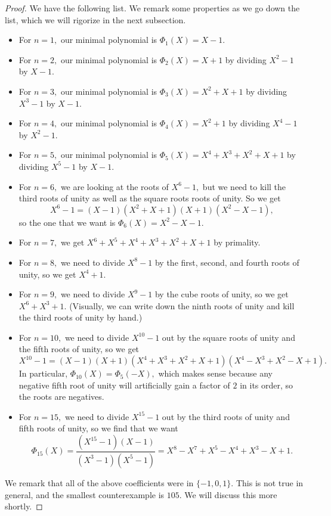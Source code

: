 \documentclass[../notes.tex]{subfiles}
\begin{document}
\begin{proof}
	We have the following list. We remark some properties as we go down the list, which we will rigorize in the next subsection.
	\begin{itemize}
		\item For $n=1,$ our minimal polynomial is $\Phi_1(X)=X-1.$
		\item For $n=2,$ our minimal polynomial is $\Phi_2(X)=X+1$ by dividing $X^2-1$ by $X-1.$
		\item For $n=3,$ our minimal polynomial is $\Phi_3(X)=X^2+X+1$ by dividing $X^3-1$ by $X-1.$
		\item For $n=4,$ our minimal polynomial is $\Phi_4(X)=X^2+1$ by dividing $X^4-1$ by $X^2-1.$
		\item For $n=5,$ our minimal polynomial is $\Phi_5(X)=X^4+X^3+X^2+X+1$ by dividing $X^5-1$ by $X-1.$ 
		\item For $n=6,$ we are looking at the roots of $X^6-1,$ but we need to kill the third roots of unity as well as the square roots roots of unity. So we get
		\[X^6-1=(X-1)\left(X^2+X+1\right)\left(X+1\right)\left(X^2-X-1\right),\]
		so the one that we want is $\Phi_6(X)=X^2-X-1.$
		\item For $n=7,$ we get $X^6+X^5+X^4+X^3+X^2+X+1$ by primality.
		\item For $n=8,$ we need to divide $X^8-1$ by the first, second, and fourth roots of unity, so we get $X^4+1.$
		\item For $n=9,$ we need to divide $X^9-1$ by the cube roots of unity, so we get $X^6+X^3+1.$ (Visually, we can write down the ninth roots of unity and kill the third roots of unity by hand.)
		\item For $n=10,$ we need to divide $X^{10}-1$ out by the square roots of unity and the fifth roots of unity, so we get
		\[X^{10}-1=(X-1)(X+1)\left(X^4+X^3+X^2+X+1\right)\left(X^4-X^3+X^2-X+1\right).\]
		In particular, $\Phi_{10}(X)=\Phi_5(-X),$ which makes sense because any negative fifth root of unity will artificially gain a factor of $2$ in its order, so the roots are negatives.
		\item For $n=15,$ we need to divide $X^{15}-1$ out by the third roots of unity and fifth roots of unity, so we find that we want
		\[\Phi_{15}(X)=\frac{\left(X^{15}-1\right)\left(X-1\right)}{\left(X^3-1\right)\left(X^5-1\right)}=X^8-X^7+X^5-X^4+X^3-X+1.\]
	\end{itemize}
	We remark that all of the above coefficients were in $\{-1,0,1\}.$ This is not true in general, and the smallest counterexample is $105.$ We will discuss this more shortly.
\end{proof}
\end{document}
